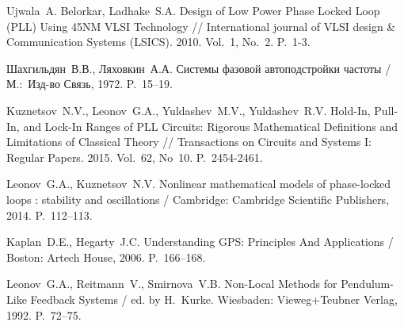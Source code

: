 \documentclass[a4paper,article,14pt]{extarticle}
\begin{document}
\begin{thebibliography}{20}
Ujwala~A. Belorkar, Ladhake~S.\:A. Design of Low Power Phase Locked Loop (PLL) Using 45NM VLSI Technology // International journal of VLSI design \& Communication Systems  (LSICS). 2010. Vol.~1, No.~2. P.~1-3.

  Шахгильдян~В.\:В., Ляховкин~А.\:А. Системы фазовой автоподстройки частоты / М.:~Изд-во Связь, 1972. P.~15--19.

 Kuznetsov~N.\:V., Leonov~G.\:A., Yuldashev~M.\:V., Yuldashev~R.\:V. Hold-In, Pull-In, and Lock-In Ranges of PLL Circuits: Rigorous Mathematical Definitions and Limitations of Classical Theory // Transactions on Circuits and Systems I: Regular Papers. 2015. Vol.~62, No~10. P.~2454-2461.
 
  Leonov~G.\:A., Kuznetsov~N.\:V. Nonlinear mathematical models of phase-locked loops : stability and oscillations / Cambridge: Cambridge Scientific Publishers, 2014. P.~112--113.

 Kaplan~D.\:E., Hegarty~J.\:C. Understanding GPS: Principles And Applications / Boston: Artech House, 2006. P.~166--168.

  Leonov~G.\:A., Reitmann~V., Smirnova~V.\:B. Non-Local Methods for Pendulum-Like Feedback Systems / ed. by H.~Kurke. Wiesbaden: Vieweg+Teubner Verlag, 1992. P.~72--75.

\end{thebibliography}
\end{document}
